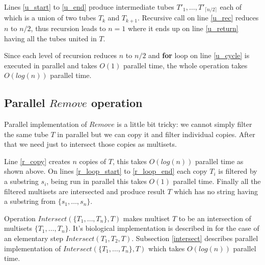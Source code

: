 
Lines \ref{u_start} to \ref{u_end} produce intermediate tubes $T'_1, \dots, T'_{\lceil n/2 \rceil}$ each of which is a union of two tubes $T_k$ and $T_{k+1}$. Recursive call on line \ref{u_rec} reduces $n$ to $n/2$, thus recursion leads to $n=1$ where it ends up on line \ref{u_return} having all the tubes united in $T$.

Since each level of recursion reduces $n$ to $n/2$ and {\bf for} loop on line \ref{u_cycle} is executed in parallel and takes $O(1)$ parallel time, the whole operation takes $O(log(n))$ parallel time.

\subsection{Parallel $Remove$ operation}

Parallel implementation of $Remove$ is a little bit tricky: we cannot simply filter the same tube $T$ in parallel but we can copy it and filter individual copies. After that we need just to intersect those copies as multisets.


Line \ref{r_copy} creates $n$ copies of $T$, this takes $O(log(n))$ parallel time as shown above. On lines \ref{r_loop_start} to \ref{r_loop_end} each copy $T_i$ is filtered by a substring $s_i$, being run in parallel this takes $O(1)$ parallel time. Finally all the filtered multisets are intersected and produce result $T$ which has no string having a substring from $\{s_1, \dots, s_n\}$.

Operation $Intersect(\{T_1, \dots, T_n\}, T)$ makes multiset $T$ to be an intersection of multisets $\{T_1, \dots, T_n\}$. It's biological implementation is described in \cite{Dantsin:2003} for the case of an elementary step $Intersect(T_1, T_2, T)$. Subsection \ref{intersect} describes parallel implementation of $Intersect(\{T_1, \dots, T_n\}, T)$ which takes $O(log(n))$ parallel time.

